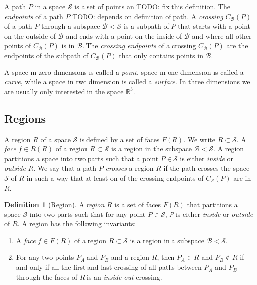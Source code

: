 \documentclass[a4paper]{article}
\theoremstyle{definition}
\newtheorem{definition}{Definition}[section]
\begin{document}
A path $P$ in a space $\mathcal{S}$ is a set of points an TODO: fix this definition.
The \emph{endpoints} of a path $P$ TODO: depends on definition of path.
A \emph{crossing} $C_\mathcal{B}(P)$ of a path $P$ through a subspace $\mathcal{B} < \mathcal{S}$ is a subpath of $P$ that starts with a point on the outside of $\mathcal{B}$ and ends with a point on the inside of $\mathcal{B}$ and where all other points of $C_\mathcal{B}(P)$ is in $\mathcal{B}$.
The \emph{crossing endpoints} of a crossing $C_\mathcal{B}(P)$ are the endpoints of the subpath of $C_\mathcal{B}(P)$ that only contains points in $\mathcal{B}$.



A space in zero dimensions is called a \emph{point},
space in one dimension is called a \emph{curve}, 
while a space in two dimension is called a \emph{surface}.
In three dimensions we are usually only interested in the space $\mathbb{R}^3$.

\subsection{Regions}
A region $R$ of a space $\mathcal{S}$ is defined by a set of faces $F(R)$.
We write $R \subset \mathcal{S}$.
A \emph{face} $f \in R(R)$ of a region $R \subset \mathcal{S}$ is a region in the subspace $\mathcal{B} < \mathcal{S}$.
A region partitions a space into two parts such that a point $P \in \mathcal{S}$ is either \emph{inside} or \emph{outside} $R$.
We say that a path $P$ \emph{crosses} a region $R$ if the path crosses the space $\mathcal{S}$ of $R$ in such a way that at least on of the crossing endpoints of $C_\mathcal{S}(P)$ are in $R$.

\begin{definition}[Region]
    A \emph{region} $R$ is a set of faces $F(R)$ that partitions a space $\mathcal{S}$ into two parts such that for any point $P \in \mathcal{S}$, $P$ is either \emph{inside} or \emph{outside} of $R$.
    A region has the following invariants:
    \begin{enumerate}
        \item A \emph{face} $f \in F(R)$ of a region $R \subset \mathcal{S}$ is a region in a subspace $\mathcal{B} < \mathcal{S}$.
        \item For any two points $P_A$ and $P_B$ and a region $R$, then $P_A \in R$ and $P_B \notin R$ if and only if all the first and last crossing of all paths between $P_A$ and $P_B$ through the faces of $R$ is an \emph{inside-out} crossing.
    \end{enumerate}
\end{definition}
\end{document}

